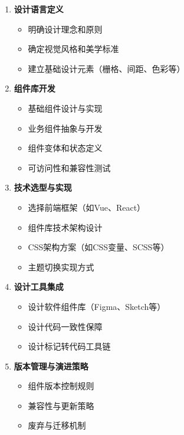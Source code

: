 \begin{enumerate}
\def\labelenumi{\arabic{enumi}.}
\tightlist
\item
  \textbf{设计语言定义}

  \begin{itemize}
  \tightlist
  \item
    明确设计理念和原则
  \item
    确定视觉风格和美学标准
  \item
    建立基础设计元素（栅格、间距、色彩等）
  \end{itemize}
\item
  \textbf{组件库开发}

  \begin{itemize}
  \tightlist
  \item
    基础组件设计与实现
  \item
    业务组件抽象与开发
  \item
    组件变体和状态定义
  \item
    可访问性和兼容性测试
  \end{itemize}
\item
  \textbf{技术选型与实现}

  \begin{itemize}
  \tightlist
  \item
    选择前端框架（如Vue、React）
  \item
    组件库技术架构设计
  \item
    CSS架构方案（如CSS变量、SCSS等）
  \item
    主题切换实现方式
  \end{itemize}
\item
  \textbf{设计工具集成}

  \begin{itemize}
  \tightlist
  \item
    设计软件组件库（Figma、Sketch等）
  \item
    设计代码一致性保障
  \item
    设计标记转代码工具链
  \end{itemize}
\item
  \textbf{版本管理与演进策略}

  \begin{itemize}
  \tightlist
  \item
    组件版本控制规则
  \item
    兼容性与更新策略
  \item
    废弃与迁移机制
  \end{itemize}
\end{enumerate}

